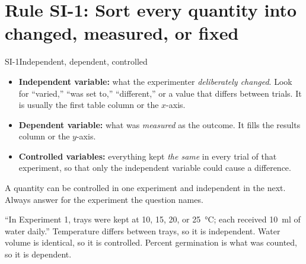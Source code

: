 \documentclass[11pt]{article}
\begin{document}
\maketitleblock

\begin{abstract}
Scientific Investigation (SI) questions ask how an experiment was built rather than what it found: which variable was changed, which was held constant, why a step was included, how two experiments differ, which tool or method gives a better measurement, and what new trial would test a new question. On the enhanced ACT the category covers about 7--12 of the 40 questions and now includes engineering-design passages, where prototypes are judged against criteria and constraints. SI questions live almost entirely in the \emph{procedure} paragraphs that most students skim. This guide gives seven rules for reading those paragraphs like a lab designer, with a worked example and a trap for each, followed by drills on five original passages.
\end{abstract}

\scoringline

\tableofcontents
\clearpage

\section{Rule SI-1: Sort every quantity into changed, measured, or fixed}

\begin{rulebox}{SI-1}{Independent, dependent, controlled}
\begin{itemize}
\item \textbf{Independent variable:} what the experimenter \emph{deliberately changed}. Look for ``varied,'' ``was set to,'' ``different,'' or a value that differs between trials. It is usually the first table column or the $x$-axis.
\item \textbf{Dependent variable:} what was \emph{measured} as the outcome. It fills the results column or the $y$-axis.
\item \textbf{Controlled variables:} everything kept \emph{the same} in every trial of that experiment, so that only the independent variable could cause a difference.
\end{itemize}
A quantity can be controlled in one experiment and independent in the next. Always answer for the experiment the question names.
\end{rulebox}

\begin{workedex}
``In Experiment 1, trays were kept at 10, 15, 20, or \SI{25}{\celsius}; each received \SI{10}{\milli\litre} of water daily.'' Temperature differs between trays, so it is independent. Water volume is identical, so it is controlled. Percent germination is what was counted, so it is dependent.
\end{workedex}
\end{document}
